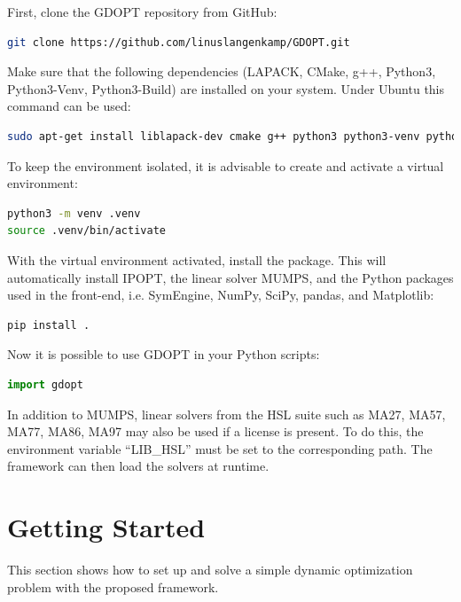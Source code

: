 \documentclass[12pt]{article}
\begin{document}
First, clone the GDOPT repository from GitHub:

\begin{lstlisting}[language=bash]
git clone https://github.com/linuslangenkamp/GDOPT.git
\end{lstlisting}

Make sure that the following dependencies (LAPACK, CMake, g++, Python3, Python3-Venv, Python3-Build) are installed on your system. Under Ubuntu this command can be used:

\begin{lstlisting}[language=bash]
sudo apt-get install liblapack-dev cmake g++ python3 python3-venv python3-build
\end{lstlisting}

To keep the environment isolated, it is advisable to create and activate a virtual environment:

\begin{lstlisting}[language=bash]
python3 -m venv .venv
source .venv/bin/activate
\end{lstlisting}

With the virtual environment activated, install the package. This will automatically install
IPOPT\cite{wachter2006implementation}, the linear solver MUMPS\cite{amestoy2001fully}, and the Python packages used in the front-end, i.e. SymEngine\cite{symengine}, NumPy\cite{harris2020array}, SciPy\cite{virtanen2020scipy}, pandas\cite{mckinney2010data}, and Matplotlib\cite{hunter2007matplotlib}:

\begin{lstlisting}[language=bash]
pip install .
\end{lstlisting}

Now it is possible to use GDOPT in your Python scripts:
\begin{lstlisting}[language=python]
import gdopt
\end{lstlisting}
In addition to MUMPS, linear solvers from the HSL suite such as MA27, MA57, MA77, MA86, MA97\cite{hsl2013collection} may also be used if a license is present. To do this, the environment variable “LIB\_HSL” must be set to the corresponding path. The framework can then load the solvers at runtime.

\section{Getting Started}
This section shows how to set up and solve a simple dynamic
optimization problem with the proposed framework.
\end{document}
